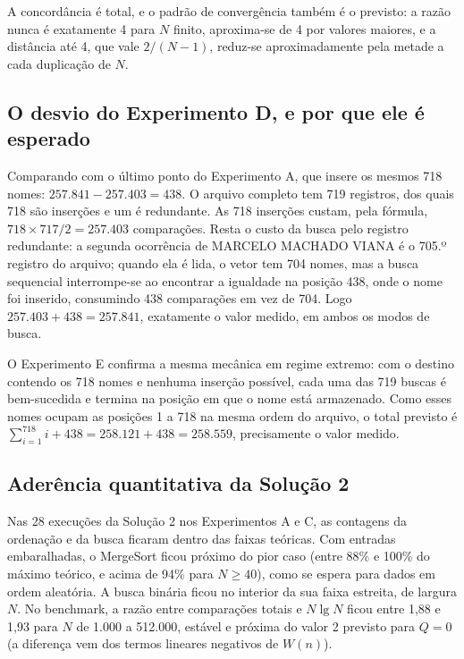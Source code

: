 \documentclass[11pt,a4paper]{article}
\begin{document}
A concordância é total, e o padrão de convergência também é o previsto: a razão nunca é exatamente 4 para $N$ finito, aproxima-se de 4 por valores maiores, e a distância até 4, que vale $2/(N-1)$, reduz-se aproximadamente pela metade a cada duplicação de $N$.

\subsection{O desvio do Experimento D, e por que ele é esperado}
\label{sec:desvioD}

Comparando com o último ponto do Experimento A, que insere os mesmos 718 nomes: $257.841-257.403=438$. O arquivo completo tem 719 registros, dos quais 718 são inserções e um é redundante. As 718 inserções custam, pela fórmula, $718\times717/2=257.403$ comparações. Resta o custo da busca pelo registro redundante: a segunda ocorrência de MARCELO MACHADO VIANA é o 705.º registro do arquivo; quando ela é lida, o vetor tem 704 nomes, mas a busca sequencial interrompe-se ao encontrar a igualdade na posição 438, onde o nome foi inserido, consumindo 438 comparações em vez de 704. Logo $257.403+438=257.841$, exatamente o valor medido, em ambos os modos de busca.

O Experimento E confirma a mesma mecânica em regime extremo: com o destino contendo os 718 nomes e nenhuma inserção possível, cada uma das 719 buscas é bem-sucedida e termina na posição em que o nome está armazenado. Como esses nomes ocupam as posições 1 a 718 na mesma ordem do arquivo, o total previsto é $\sum_{i=1}^{718}i+438=258.121+438=258.559$, precisamente o valor medido.

\subsection{Aderência quantitativa da Solução 2}

Nas 28 execuções da Solução 2 nos Experimentos A e C, as contagens da ordenação e da busca ficaram dentro das faixas teóricas. Com entradas embaralhadas, o MergeSort ficou próximo do pior caso (entre 88\% e 100\% do máximo teórico, e acima de 94\% para $N\ge40$), como se espera para dados em ordem aleatória. A busca binária ficou no interior da sua faixa estreita, de largura $N$. No benchmark, a razão entre comparações totais e $N\lg N$ ficou entre 1,88 e 1,93 para $N$ de 1.000 a 512.000, estável e próxima do valor 2 previsto para $Q=0$ (a diferença vem dos termos lineares negativos de $W(n)$).
\end{document}
